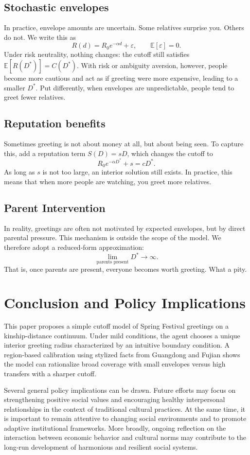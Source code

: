 \documentclass[AER]{AEA}
\DeclareRobustCommand{\AERlink}[1]{}
\begin{document}
\subsection{Stochastic envelopes}
In practice, envelope amounts are uncertain. Some relatives surprise you. Others do not. We write this as
\[
R(d)=R_0 e^{-\alpha d}+\varepsilon,\qquad \mathbb{E}[\varepsilon]=0.
\]
Under risk neutrality, nothing changes: the cutoff still satisfies $\mathbb{E}[R(D^*)]=C(D^*)$. With risk or ambiguity aversion, however, people become more cautious and act as if greeting were more expensive, leading to a smaller $D^*$. Put differently, when envelopes are unpredictable, people tend to greet fewer relatives.

\subsection{Reputation benefits}
Sometimes greeting is not about money at all, but about being seen. To capture this, add a reputation term $S(D)=sD$, which changes the cutoff to
\[
R_0 e^{-\alpha D^*}+s=cD^*.
\]
As long as $s$ is not too large, an interior solution still exists. In practice, this means that when more people are watching, you greet more relatives.

\subsection{Parent Intervention}
In reality, greetings are often not motivated by expected envelopes, but by direct parental pressure. This mechanism is outside the scope of the model. We therefore adopt a reduced-form approximation:
\[
\lim_{\text{parents present}} D^* \to \infty.
\]
That is, once parents are present, everyone becomes worth greeting. What a pity.

\section{Conclusion and Policy Implications}
This paper proposes a simple cutoff model of Spring Festival greetings on a kinship-distance continuum. Under mild conditions, the agent chooses a unique interior greeting radius characterized by an intuitive boundary condition. A region-based calibration using stylized facts from Guangdong and Fujian shows the model can rationalize broad coverage with small envelopes versus high transfers with a sharper cutoff. 

Several general policy implications can be drawn. Future efforts may focus on strengthening positive social values and encouraging healthy interpersonal relationships in the context of traditional cultural practices. At the same time, it is important to remain attentive to changing social environments and to promote adaptive institutional frameworks. More broadly, ongoing reflection on the interaction between economic behavior and cultural norms may contribute to the long-run development of harmonious and resilient social systems.

\FloatBarrier

\DeclareRobustCommand{\AERlink}[1]{\makebox[0pt][r]{\href{#1}{\color{blue}$\blacktriangleright$}\hspace{0.3em}}}

\nocite{*}


\end{document}
